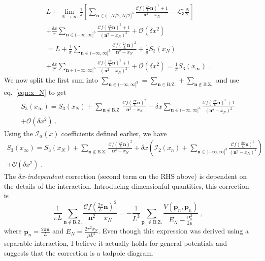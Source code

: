 \documentclass[11pt]{article}
\begin{document}
\begin{multline}
L+\lim_{N\to\infty}\frac{1}{\pi}\left[\sum_{\bm n\in(-N/2,N/2]^3}\frac{\mathcal{C}f\left(\frac{2\pi}{L}\bm n\right)^2+1}{\bm n^2-x_N}-\mathcal{L}^\square_3\frac{N}{2}\right]\\
+ \frac{\delta x}{\pi}\sum_{\bm n\in(-\infty,\infty]^3}\frac{\mathcal{C}f\left(\frac{2\pi}{L}\bm n\right)^2+1}{\left(\bm n^2-x_N\right)^2}+\mathcal{O}(\delta x^2)\\
=L+\frac{1}{\pi}\sum_{\bm n\in(-\infty,\infty]^3}\frac{\mathcal{C}f\left(\frac{2\pi}{L}\bm n\right)^2}{\bm n^2-x_N}+\frac{1}{\pi}S_3(x_N)\\
+ \frac{\delta x}{\pi}\sum_{\bm n\in(-\infty,\infty]^3}\frac{\mathcal{C}f\left(\frac{2\pi}{L}\bm n\right)^2+1}{\left(\bm n^2-x_N\right)^2}+\mathcal{O}(\delta x^2)=\frac{1}{\pi}S_3(x_\infty)\ .
\end{multline}
We now split the first sum into $\sum_{\bm n\in(-\infty,\infty]^3}=\sum_{\bm n\in\mathrm{B.Z.}}+\sum_{\bm n\notin\mathrm{B.Z.}}$ and use eq.~\eqref{eqn:x_N} to get
\begin{multline}
S_3(x_\infty)=S_3(x_N)+\sum_{\bm n\notin\mathrm{B.Z.}}\frac{\mathcal{C}f\left(\frac{2\pi}{L}\bm n\right)^2}{\bm n^2-x_N}
+ \delta x\sum_{\bm n\in(-\infty,\infty]^3}\frac{\mathcal{C}f\left(\frac{2\pi}{L}\bm n\right)^2+1}{\left(\bm n^2-x_N\right)^2}\\+\mathcal{O}(\delta x^2)\ .
\end{multline}
Using the $\mathcal{I}_\alpha(x)$ coefficients defined earlier, we have
\begin{multline}
S_3(x_\infty)=S_3(x_N)+\sum_{\bm n\notin\mathrm{B.Z.}}\frac{\mathcal{C}f\left(\frac{2\pi}{L}\bm n\right)^2}{\bm n^2-x_N}
+ \delta x\left(\mathcal{I}_2(x_n)+\sum_{\bm n\in(-\infty,\infty]^3}\frac{\mathcal{C}f\left(\frac{2\pi}{L}\bm n\right)^2}{\left(\bm n^2-x_N\right)^2}\right)\\+\mathcal{O}(\delta x^2)\ .
\end{multline}
The $\delta x$-\emph{independent} correction (second term on the RHS above) is dependent on the details of the interaction.  Introducing dimensionful quantities, this correction is
\begin{equation}
\frac{1}{\pi L}\sum_{\bm n\notin\mathrm{B.Z.}}\frac{\mathcal{C}f\left(\frac{2\pi}{L}\bm n\right)^2}{\bm n^2-x_N}
=-\frac{1}{L^3}\sum_{\bm p_n\notin\mathrm{B.Z.}}\frac{V(\bm p_n,\bm p_n)}{E_N-\frac{\bm p_n^2}{2\mu}}\ ,
\end{equation}
where $\bm p_n=\frac{2\pi \bm n}{L}$ and $E_N=\frac{2\pi^2 x_N}{\mu L^2}$. 
Even though this expression was derived using a separable interaction, I believe it actually holds for general potentials and suggests that the correction is a tadpole diagram. 
\end{document}
